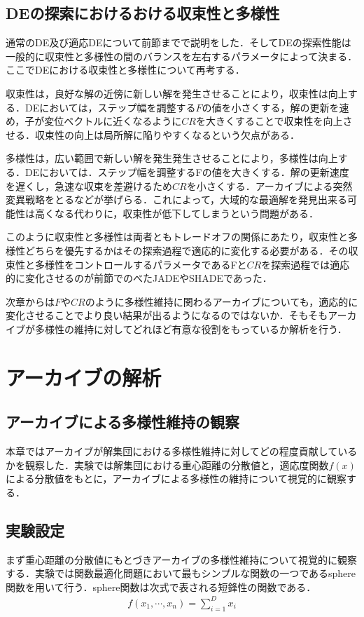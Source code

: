 \documentclass[a4paper,11pt,oneside,openany]{jsbook}
\begin{document}
\section{DEの探索におけるおける収束性と多様性}
通常のDE及び適応DEについて前節までで説明をした．そしてDEの探索性能は一般的に収束性と多様性の間のバランスを左右するパラメータによって決まる．ここでDEにおける収束性と多様性について再考する．

収束性は，良好な解の近傍に新しい解を発生させることにより，収束性は向上する．DEにおいては，ステップ幅を調整する$F$の値を小さくする，解の更新を速め，子が変位ベクトルに近くなるように$CR$を大きくすることで収束性を向上させる．収束性の向上は局所解に陥りやすくなるという欠点がある．

多様性は，広い範囲で新しい解を発生発生させることにより，多様性は向上する．DEにおいては．ステップ幅を調整するFの値を大きくする．解の更新速度を遅くし，急速な収束を差避けるため$CR$を小さくする．アーカイブによる突然変異戦略をとるなどが挙げらる．これによって，大域的な最適解を発見出来る可能性は高くなる代わりに，収束性が低下してしまうという問題がある．

このように収束性と多様性は両者ともトレードオフの関係にあたり，収束性と多様性どちらを優先するかはその探索過程で適応的に変化する必要がある．その収束性と多様性をコントロールするパラメータであるFと$CR$を探索過程では適応的に変化させるのが前節でのべたJADEやSHADEであった．

次章からは$F$や$CR$のように多様性維持に関わるアーカイブについても，適応的に変化させることでより良い結果が出るようになるのではないか．そもそもアーカイブが多様性の維持に対してどれほど有意な役割をもっているか解析を行う．


\chapter{アーカイブの解析}
\section{アーカイブによる多様性維持の観察}
本章ではアーカイブが解集団における多様性維持に対してどの程度貢献しているかを観察した．実験では解集団における重心距離の分散値と，適応度関数$f(x)$による分散値をもとに，アーカイブによる多様性の維持について視覚的に観察する．

\section{実験設定}
まず重心距離の分散値にもとづきアーカイブの多様性維持について視覚的に観察する．実験では関数最適化問題において最もシンプルな関数の一つであるsphere関数を用いて行う．sphere関数は次式で表される短鋒性の関数である．
\begin{eqnarray}
  f(x_1,\cdots,x_n) = \sum_{i=1}^D x_i
\end{eqnarray}
\end{document}
